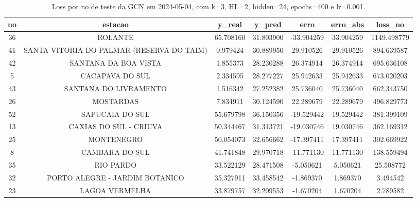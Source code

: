\begin{table}[h]
\centering
\caption{Loss por no de teste da GCN em 2024-05-04, com k=3, HL=2, hidden=24, epochs=400 e lr=0.001.}
\label{tab:gcn_loss_k3_hl2_h24_e400_d20240504}
\begin{tabular}{ccccccc}
\toprule
no & estacao & y\_real & y\_pred & erro & erro\_abs & loss\_no \\
\midrule
36 & ROLANTE & 65.708160 & 31.803900 & -33.904259 & 33.904259 & 1149.498779 \\
41 & SANTA VITORIA DO PALMAR (RESERVA DO TAIM) & 0.979424 & 30.889950 & 29.910526 & 29.910526 & 894.639587 \\
42 & SANTANA DA BOA VISTA & 1.855373 & 28.230288 & 26.374914 & 26.374914 & 695.636108 \\
5 & CACAPAVA DO SUL & 2.334595 & 28.277227 & 25.942633 & 25.942633 & 673.020203 \\
43 & SANTANA DO LIVRAMENTO & 1.516342 & 27.252382 & 25.736040 & 25.736040 & 662.343750 \\
26 & MOSTARDAS & 7.834911 & 30.124590 & 22.289679 & 22.289679 & 496.829773 \\
52 & SAPUCAIA DO SUL & 55.679798 & 36.150356 & -19.529442 & 19.529442 & 381.399109 \\
13 & CAXIAS DO SUL - CRIUVA & 50.344467 & 31.313721 & -19.030746 & 19.030746 & 362.169312 \\
25 & MONTENEGRO & 50.054073 & 32.656662 & -17.397411 & 17.397411 & 302.669922 \\
8 & CAMBARA DO SUL & 41.741848 & 29.970718 & -11.771130 & 11.771130 & 138.559494 \\
35 & RIO PARDO & 33.522129 & 28.471508 & -5.050621 & 5.050621 & 25.508772 \\
32 & PORTO ALEGRE - JARDIM BOTANICO & 35.327911 & 33.458542 & -1.869370 & 1.869370 & 3.494542 \\
23 & LAGOA VERMELHA & 33.879757 & 32.209553 & -1.670204 & 1.670204 & 2.789582 \\
\bottomrule
\end{tabular}
\end{table}
